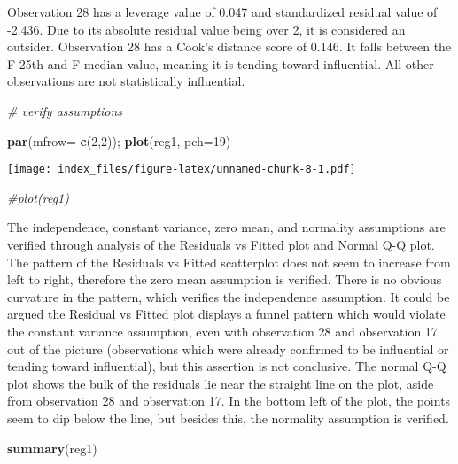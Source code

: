 \documentclass[
]{article}
\newenvironment{Shaded}{\begin{snugshade}}{\end{snugshade}}
\newcommand{\AttributeTok}[1]{\textcolor[rgb]{0.13,0.29,0.53}{#1}}
\newcommand{\CommentTok}[1]{\textcolor[rgb]{0.56,0.35,0.01}{\textit{#1}}}
\newcommand{\DecValTok}[1]{\textcolor[rgb]{0.00,0.00,0.81}{#1}}
\newcommand{\FunctionTok}[1]{\textcolor[rgb]{0.13,0.29,0.53}{\textbf{#1}}}
\newcommand{\NormalTok}[1]{#1}
\begin{document}
Observation 28 has a leverage value of 0.047 and standardized residual
value of -2.436. Due to its absolute residual value being over 2, it is
considered an outsider. Observation 28 has a Cook's distance score of
0.146. It falls between the F-25th and F-median value, meaning it is
tending toward influential. All other observations are not statistically
influential.

\begin{Shaded}
\begin{Highlighting}[]
\CommentTok{\# verify assumptions}

\FunctionTok{par}\NormalTok{(}\AttributeTok{mfrow=} \FunctionTok{c}\NormalTok{(}\DecValTok{2}\NormalTok{,}\DecValTok{2}\NormalTok{)); }\FunctionTok{plot}\NormalTok{(reg1, }\AttributeTok{pch=}\DecValTok{19}\NormalTok{)}
\end{Highlighting}
\end{Shaded}

\texttt{[image: index\_files/figure-latex/unnamed-chunk-8-1.pdf]}

\begin{Shaded}
\begin{Highlighting}[]
\CommentTok{\#plot(reg1)}
\end{Highlighting}
\end{Shaded}

The independence, constant variance, zero mean, and normality
assumptions are verified through analysis of the Residuals vs Fitted
plot and Normal Q-Q plot. The pattern of the Residuals vs Fitted
scatterplot does not seem to increase from left to right, therefore the
zero mean assumption is verified. There is no obvious curvature in the
pattern, which verifies the independence assumption. It could be argued
the Residual vs Fitted plot displays a funnel pattern which would
violate the constant variance assumption, even with observation 28 and
observation 17 out of the picture (observations which were already
confirmed to be influential or tending toward influential), but this
assertion is not conclusive. The normal Q-Q plot shows the bulk of the
residuals lie near the straight line on the plot, aside from observation
28 and observation 17. In the bottom left of the plot, the points seem
to dip below the line, but besides this, the normality assumption is
verified.

\begin{Shaded}
\begin{Highlighting}[]
\FunctionTok{summary}\NormalTok{(reg1)}
\end{Highlighting}
\end{Shaded}
\end{document}
